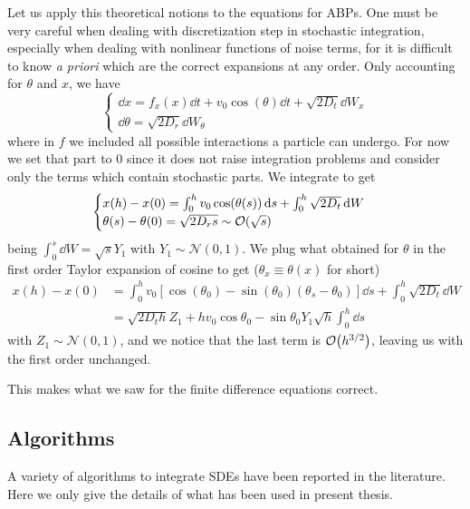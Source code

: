 \documentclass[../../master_thesis_np.tex]{subfiles}
\begin{document}
		Let us apply this theoretical notions to the equations for ABPs. 
		One must be very careful when dealing with discretization step in stochastic integration, especially when dealing with nonlinear functions of noise terms, for it is difficult to know \emph{a priori} which are the correct expansions at any order. 
		Only accounting for $\theta$ and $x$, we have
		\begin{equation} 
			\begin{cases}
			\dd{x} = f_x(x)\dd{t} + v_0\cos(\theta)\dd{t} + \sqrt{2D_t}\dd{W_x} \\
			\dd{\theta} = \sqrt{2D_r}\dd{W_\theta}
			\end{cases} 
		\end{equation} 
		where in $f$ we included all possible interactions a particle can undergo. 
		For now we set that part to 0 since it does not raise integration problems and consider only the terms which contain stochastic parts. 
		We integrate to get
		\begin{equation}
			\begin{cases}
				x(h) - x(0) =  \int_{0}^{h}v_0 \cos(\theta(s)) \dd{s} + \int_{0}^{h} \sqrt{2D_t}\dd{W} \\
			\theta(s) - \theta(0) = \sqrt{2D_r s} \sim \order{\sqrt{s}}
		    \end{cases}  
	    \end{equation}
		being $\int_{0}^{s}\dd{W} = \sqrt{s} Y_1$ with $Y_1 \sim \mathcal{N}(0,1)$. 
		We plug what obtained for $\theta$ in the first order Taylor expansion of cosine to get ($\theta_x \equiv \theta(x)$ for short)
		\begin{align} 
			x(h) - x(0) &=  \int_{0}^{h}v_0 \left[\cos(\theta_0) - \sin(\theta_0)(\theta_s-\theta_0)\right]\dd{s} + \int_{0}^{h} \sqrt{2D_t}\dd{W}  \\
			& = \sqrt{2D_th} Z_1 + hv_0 \cos\theta_0 - \sin \theta_0 Y_1 \sqrt{h} \int_{0}^{h}\dd{s}
	    \end{align}
	    with $Z_1 \sim \mathcal{N}(0,1)$, and we notice that the last term is $\order{h^{3/2}}$, leaving us with the first order unchanged.
	    
	    This makes what we saw for the finite difference equations correct.
	    
		\subsection{Algorithms}
		A variety of algorithms to integrate SDEs have been reported in the literature. 
		Here we only give the details of what has been used in present thesis.
		
\end{document}
